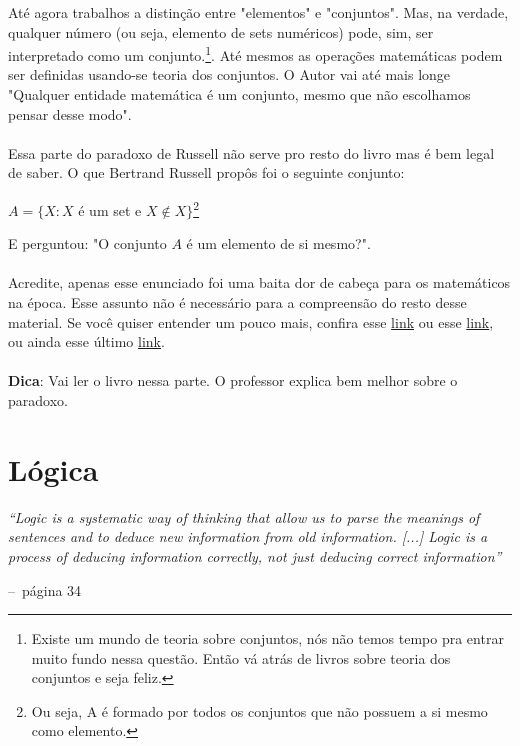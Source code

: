 \documentclass[a4paper,11pt]{book}
\makeatletter
\theoremstyle{definition}
\theoremstyle{break}
\newenvironment{chapquote}[2][2em]
  {\setlength{\@tempdima}{#1}%
   \def\chapquote@author{#2}%
   \parshape 1 \@tempdima \dimexpr\textwidth-2\@tempdima\relax%
   \itshape}
  {\par\normalfont\hfill--\ \chapquote@author\hspace*{\@tempdima}\par\bigskip}
\makeatother
\begin{document}
Até agora trabalhos a distinção entre "elementos" e "conjuntos". Mas, na verdade, qualquer número (ou seja, elemento de sets numéricos) pode, sim, ser interpretado como um conjunto.\footnote{Existe um mundo de teoria sobre conjuntos, nós não temos tempo pra entrar muito fundo nessa questão. Então vá atrás de livros sobre teoria dos conjuntos e seja feliz.}. Até mesmos as operações matemáticas podem ser definidas usando-se teoria dos conjuntos. O Autor vai até mais longe "Qualquer entidade matemática é um conjunto, mesmo que não escolhamos pensar desse modo".
\\
\\
Essa parte do paradoxo de Russell não serve pro resto do livro mas é bem legal de saber. O que Bertrand Russell propôs foi o seguinte conjunto:
\begin{center}
	$ A = \{ X : X $ é um set e $X \notin X \}$\footnote{Ou seja, A é formado por todos os conjuntos que não possuem a si mesmo como elemento.}
\end{center}
E perguntou: "O conjunto $A$ é um elemento de si mesmo?".
\\
\\
Acredite, apenas esse enunciado foi uma baita dor de cabeça para os matemáticos na época. Esse assunto não é necessário para a compreensão do resto desse material. Se você quiser entender um pouco mais, confira esse \href{https://www.youtube.com/watch?v=AQTTYAM8BF0}{link} ou esse \href{https://www.youtube.com/watch?v=0Bs0lJRxOaI}{link}, ou ainda esse último \href{https://www.youtube.com/watch?v=HeQX2HjkcNo}{link}.
\\
\\
\textbf{Dica}: Vai ler o livro nessa parte. O professor explica bem melhor sobre o paradoxo.

\chapter{Lógica}

\begin{chapquote}{página 34}
	``Logic is a systematic way of thinking that allow us to parse the meanings of sentences and to deduce new information from old information. [...] Logic is  a process of deducing information correctly, not just deducing correct information''
\end{chapquote}
\end{document}
